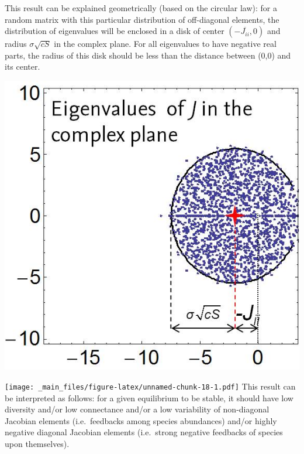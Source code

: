\documentclass[
]{book}
\newenvironment{Shaded}{\begin{snugshade}}{\end{snugshade}}
\newcommand{\AttributeTok}[1]{\textcolor[rgb]{0.13,0.29,0.53}{#1}}
\newcommand{\DecValTok}[1]{\textcolor[rgb]{0.00,0.00,0.81}{#1}}
\newcommand{\FunctionTok}[1]{\textcolor[rgb]{0.13,0.29,0.53}{\textbf{#1}}}
\newcommand{\NormalTok}[1]{#1}
\newcommand{\OtherTok}[1]{\textcolor[rgb]{0.56,0.35,0.01}{#1}}
\newcommand{\SpecialCharTok}[1]{\textcolor[rgb]{0.81,0.36,0.00}{\textbf{#1}}}
\theoremstyle{definition}
\theoremstyle{definition}
\theoremstyle{definition}
\theoremstyle{definition}
\theoremstyle{remark}
\begin{document}
This result can be explained geometrically (based on the circular law): for a random matrix with this particular distribution of off-diagonal elements, the distribution of eigenvalues will be enclosed in a disk of center \(\left(-\overline{J_{ii}},0\right)\) and radius \(\sigma \sqrt{cS}\) in the complex plane. For all eigenvalues to have negative real parts, the radius of this disk should be less than the distance between (0,0) and its center.

\includegraphics[width=7.9in]{fig06Networks/May}

\begin{Shaded}
\end{Shaded}

\texttt{[image: \_main\_files/figure-latex/unnamed-chunk-18-1.pdf]}
This result can be interpreted as follows: for a given equilibrium to be stable, it should have low diversity and/or low connectance and/or a low variability of non-diagonal Jacobian elements (i.e.~feedbacks among species abundances) and/or highly negative diagonal Jacobian elements (i.e.~strong negative feedbacks of species upon themselves).
\end{document}

